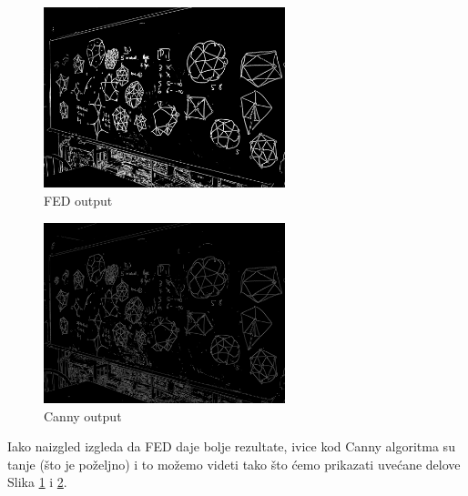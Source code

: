 \documentclass[12pt,a4paper]{article}
\theoremstyle{definition}
\theoremstyle{remark}
\theoremstyle{plain}
\begin{document}
\begin{multicols}{2}
\begin{figure}[H]
\centering
\includegraphics[width=7cm]{images/blackboard_35.png}
  \caption{FED output}\label{fed_output}
\end{figure}

\columnbreak

\begin{figure}[H]
\centering
\includegraphics[width=7cm]{images/blackboard_canny.png}
  \caption{Canny output}\label{canny_output}
\end{figure}
\end{multicols}

Iako naizgled izgleda da FED daje bolje rezultate, ivice kod Canny algoritma su tanje (\v sto je po\v zeljno) i to mo\v zemo videti tako \v sto \' cemo prikazati uve\' cane delove Slika \ref{fed_output} i \ref{canny_output}.
\end{document}
